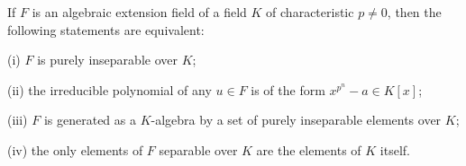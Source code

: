 If $F$ is an algebraic extension field of a field $K$ of characteristic $p \neq 0$, then the following statements are equivalent:

(i) $F$ is purely inseparable over $K$;

(ii) the irreducible polynomial of any $u \in F$ is of the form $x^{p^n} - a \in K[x]$;

(iii) $F$ is generated as a $K$-algebra by a set of purely inseparable elements over $K$;

(iv) the only elements of $F$ separable over $K$ are the elements of $K$ itself.
